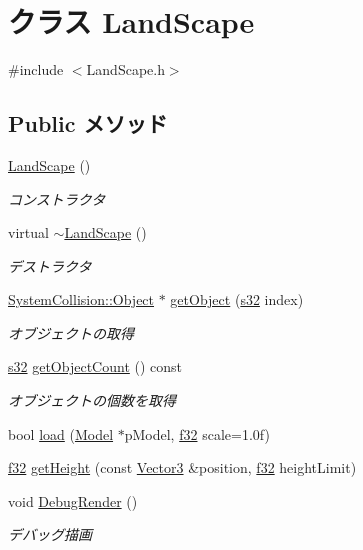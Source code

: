 \hypertarget{class_land_scape}{\section{クラス Land\-Scape}
\label{class_land_scape}
}


{\ttfamily \#include $<$Land\-Scape.\-h$>$}

\subsection*{Public メソッド}
\begin{DoxyCompactItemize}
\item 
\hyperlink{class_land_scape_a2369afc001c88339449b031e3a44ecca}{Land\-Scape} ()
\begin{DoxyCompactList}\small\item\em コンストラクタ \end{DoxyCompactList}\item 
virtual \hyperlink{class_land_scape_a94768f0b8eaa888ca57f40d3b8f4a513}{$\sim$\-Land\-Scape} ()
\begin{DoxyCompactList}\small\item\em デストラクタ \end{DoxyCompactList}\item 
\hyperlink{class_system_collision_1_1_object}{System\-Collision\-::\-Object} $\ast$ \hyperlink{class_land_scape_a3feb8defdb17a44dd5481ed27667c4a5}{get\-Object} (\hyperlink{_main_8h_a0ce6887c26c1c49ad3be5710dd42bfd6}{s32} index)
\begin{DoxyCompactList}\small\item\em オブジェクトの取得 \end{DoxyCompactList}\item 
\hyperlink{_main_8h_a0ce6887c26c1c49ad3be5710dd42bfd6}{s32} \hyperlink{class_land_scape_aee02acd8b9b84aa6dcc21d1b64fbddf4}{get\-Object\-Count} () const 
\begin{DoxyCompactList}\small\item\em オブジェクトの個数を取得 \end{DoxyCompactList}\item 
bool \hyperlink{class_land_scape_a58f543605f1200cf3e051ffeff2401a0}{load} (\hyperlink{class_model}{Model} $\ast$p\-Model, \hyperlink{_main_8h_a5f6906312a689f27d70e9d086649d3fd}{f32} scale=1.\-0f)
\item 
\hyperlink{_main_8h_a5f6906312a689f27d70e9d086649d3fd}{f32} \hyperlink{class_land_scape_a2ba8db9eab3c42dbee9489cee820864d}{get\-Height} (const \hyperlink{struct_vector3}{Vector3} \&position, \hyperlink{_main_8h_a5f6906312a689f27d70e9d086649d3fd}{f32} height\-Limit)
\item 
void \hyperlink{class_land_scape_a404d083539bee3507eb3b378fbf4d889}{Debug\-Render} ()
\begin{DoxyCompactList}\small\item\em デバッグ描画 \end{DoxyCompactList}\end{DoxyCompactItemize}


